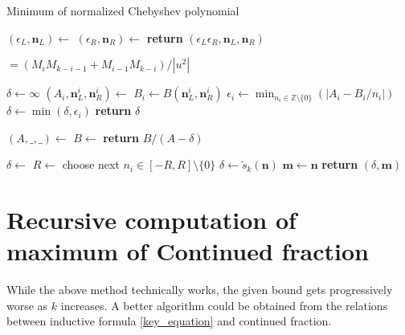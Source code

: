 \documentclass{article}
\theoremstyle{definition}
\theoremstyle{plain}
\theoremstyle{remark}
\numberwithin{equation}{section}
\newcommand{\integer}{\mathbb{Z}}
\newcommand{\abs}[1]{\left\lvert{#1}\right\rvert}
\begin{document}
\begin{algorithm}
  \caption{Minimum of normalized Chebyshev polynomial}
  \begin{algorithmic}
      \State $(\epsilon_L, \mathbf{n}_L) \gets$ 
      \State $(\epsilon_R, \mathbf{n}_R) \gets$ 
      \State \textbf{return} $(\epsilon_L \epsilon_R, \mathbf{n}_L, \mathbf{n}_R)$
    \EndFunction

     $= (M_i M_{k-i-1} + M_{i-1} M_{k-i}) / \abs{u^2}$
    \EndFunction

      \State $\delta \gets \infty$
        \State $(A_i, \mathbf{n}^i_L, \mathbf{n}^i_R) \gets$ 
        \State $B_i \gets B(\mathbf{n}^i_L, \mathbf{n}^i_R)$
        \State $\epsilon_i \gets \min_{n_i \in \integer \setminus \{0\}} (\abs{A_i - B_i / n_i})$
        \State $\delta \gets \min(\delta, \epsilon_i)$
      \EndFor
      \State \textbf{return} $\delta$
    \EndFunction

      \State $(A, \_, \_) \gets$ 
      \State $B \gets$ 
      \State \textbf{return} {$B / (A - \delta)$}
    \EndFunction

      \State $\delta \gets$ 
          \State $R \gets$ 
          \State choose next $n_i \in [- R, R] \setminus \{0\}$
        \EndFor
          \State $\delta \gets \tilde{s}_k(\mathbf{n})$
          \State $\mathbf{m} \gets \mathbf{n}$
        \EndIf
      \EndWhile
      \State \textbf{return} $(\delta, \mathbf{m})$
    \EndFunction
  \end{algorithmic}
\end{algorithm}

\section{Recursive computation of maximum of Continued fraction}

While the above method technically works,
the given bound gets progressively worse as $k$ increases.
A better algorithm could be obtained from the relations between
inductive formula \eqref{key_equation} and continued fraction.
\end{document}
